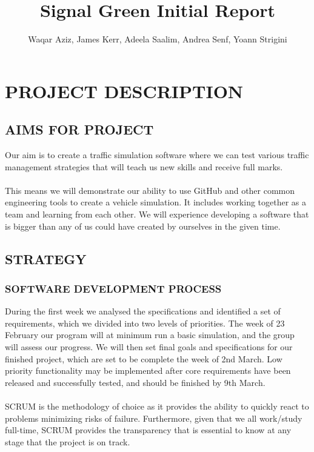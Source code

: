 \documentclass[11pt]{article}
\begin{document}
\title{Signal Green Initial Report}

\author{Waqar Aziz, James Kerr, Adeela Saalim, Andrea Senf, Yoann Strigini}

\maketitle 


\section{PROJECT DESCRIPTION}


\subsection{AIMS FOR PROJECT}

Our aim is to create a traffic simulation software where we can test various traffic management strategies that will teach us new skills and receive full marks. 
\\ \\
This means we will demonstrate our ability to use GitHub and other common engineering tools to create a vehicle simulation. It includes working together as a team and learning from each other. We will experience developing a software that is bigger than any of us could have created by ourselves in the given time. 


\subsection{STRATEGY}

\subsubsection*{SOFTWARE DEVELOPMENT PROCESS}

During the first week we analysed the specifications and identified a set of requirements, which we divided into two levels of priorities. The week of 23 February our program will at minimum run a basic simulation, and the group will assess our progress. We 
will then set final goals and specifications for our finished project, which are set to be complete the week of 2nd March. Low priority functionality may be implemented after core requirements have been released and successfully tested, and should be finished by 
9th March.
\\ \\ 
SCRUM is the methodology of choice as it provides the ability to quickly react to problems minimizing risks of failure. Furthermore, given that we all work/study full-time, SCRUM provides the transparency that is essential to know at any stage that the project is on track.
\end{document}
